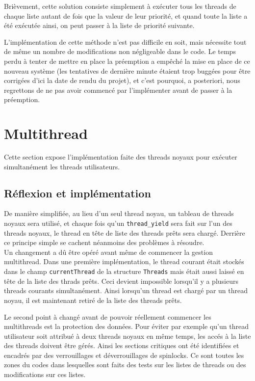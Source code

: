 \documentclass[a4paper,11pt]{article}
\begin{document}
Brièvement, cette solution consiste simplement à exécuter tous les threads de chaque liste autant de fois que la valeur de leur priorité, et quand toute la liste a été exécutée ainsi, on peut passer à la liste de priorité suivante.

L'implémentation de cette méthode n'est pas difficile en soit, mais nécessite tout de même un nombre de modifications non négligeable dans le code. Le temps perdu à tenter de mettre en place la préemption a empêché la mise en place de ce nouveau système (les tentatives de dernière minute étaient trop buggées pour être corrigées d'ici la date de rendu du projet), et c'est pourquoi, a posteriori, nous regrettons de ne pas avoir commencé par l'implémenter avant de passer à la préemption.

\section{Multithread}

Cette section expose l'implémentation faite des threads noyaux pour exécuter simultanément les threads utilisateurs.

\subsection{Réflexion et implémentation}

De manière simplifiée, au lieu d'un seul thread noyau, un tableau de threads noyaux sera utilisé, et chaque fois qu'un \texttt{thread\_yield} sera fait sur l'un des threads noyaux, le thread en tête de liste des threads prêts sera chargé. Derrière ce principe simple se cachent néanmoins des problèmes à résoudre.\\

Un changement a dû être opéré avant même de commencer la gestion multithread. Dans une première implémentation, le thread courant était stockés dans le champ \texttt{currentThread} de la structure \texttt{Threads} mais était aussi laissé en tête de la liste des thrads prêts. Ceci devient impossible lorsqu'il y a plusieurs threads courants simultanément. Ainsi lorsqu'un thread est chargé par un thread noyau, il est maintenant retiré de la liste des threads prêts.

Le second point à changé avant de pouvoir réellement commencer les multithreads est la protection des données. Pour éviter par exemple qu'un thread utilisateur soit attribué à deux threads noyaux en même temps, les accés à la liste des threads doivent être gérés. Ainsi les sections critiques ont été identifiées et encadrés par des verrouillages et déverrouillages de spinlocks. Ce sont toutes les zones du codes dans lesquelles sont faits des tests sur les listes de threads ou des modifications sur ces listes.\\
\end{document}
